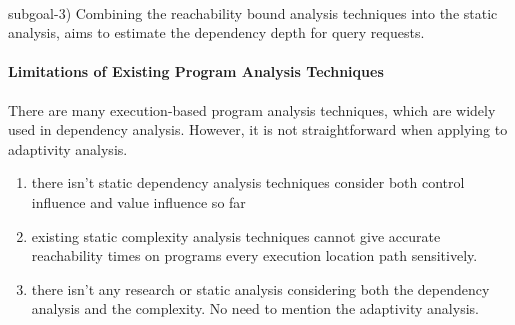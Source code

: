 \\
subgoal-3) Combining the reachability bound analysis techniques into the static analysis,
aims to estimate
the dependency depth for query requests.
\paragraph{Limitations of Existing Program Analysis Techniques}
There are many execution-based program analysis techniques, which are widely used in  dependency analysis. 
However, it is not straightforward when applying to adaptivity analysis.
\begin{enumerate}
\item there isn't static dependency analysis techniques consider both control influence and value influence so far
\item existing static complexity analysis techniques cannot give accurate reachability times on programs 
every execution location path sensitively.
\item there isn't any research or static analysis considering both the dependency analysis
and the complexity. No need to mention the adaptivity analysis.
\end{enumerate}

